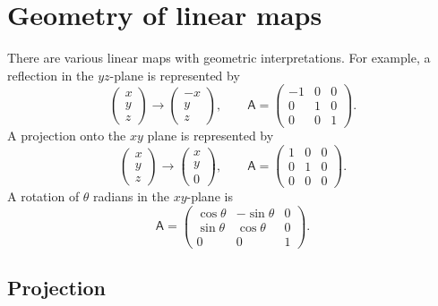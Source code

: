 \documentclass[letter-paper]{tufte-book}
\begin{document}

\section{Geometry of linear maps}

There are various linear maps with geometric interpretations. For example, a
reflection in the $yz$-plane is represented by
\begin{equation*}
	\begin{pmatrix}x\\y\\z\end{pmatrix}\rightarrow
	\begin{pmatrix}-x\\y\\z\end{pmatrix},\qquad
	\mathsf{A}=\begin{pmatrix}-1&0&0\\0&1&0\\0&0&1\end{pmatrix}.
\end{equation*}
A projection onto the $xy$ plane is represented by
\begin{equation*}
	\begin{pmatrix}x\\y\\z\end{pmatrix}\rightarrow
	\begin{pmatrix}x\\y\\0\end{pmatrix},\qquad
	\mathsf{A}=\begin{pmatrix}1&0&0\\0&1&0\\0&0&0\end{pmatrix}.
\end{equation*}
A rotation of $\theta$ radians in the $xy$-plane is
\begin{equation*}
	\mathsf{A}=\begin{pmatrix}\cos\theta&-\sin\theta&0\\
	\sin\theta&\cos\theta&0\\0&0&1\end{pmatrix}.
\end{equation*}

\subsection{Projection}
\end{document}
